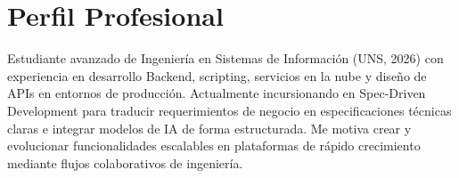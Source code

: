 \section{Perfil Profesional}
\begin{itemize}[leftmargin=0.15in, label={}]
    \small{\item{
        Estudiante avanzado de Ingeniería en Sistemas de Información (UNS, 2026) con experiencia en desarrollo Backend, scripting, servicios en la nube y diseño de APIs en entornos de producción. Actualmente incursionando en Spec-Driven Development para traducir requerimientos de negocio en especificaciones técnicas claras e integrar modelos de IA de forma estructurada. Me motiva crear y evolucionar funcionalidades escalables en plataformas de rápido crecimiento mediante flujos colaborativos de ingeniería.
    }}
\end{itemize}
\vspace{-16pt}
